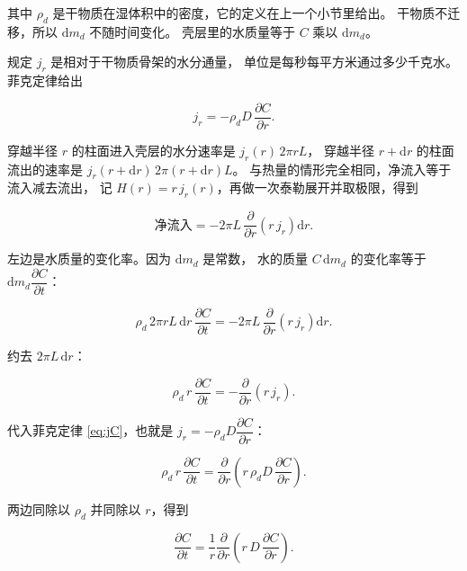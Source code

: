 其中 $\rho_d$ 是干物质在湿体积中的密度，它的定义在上一个小节里给出。
干物质不迁移，所以 $\mathrm{d}m_d$ 不随时间变化。
壳层里的水质量等于 $C$ 乘以 $\mathrm{d}m_d$。

规定 $j_r$ 是相对于干物质骨架的水分通量，
单位是每秒每平方米通过多少千克水。菲克定律给出

\begin{equation}
j_r = -\rho_d D\,\frac{\partial C}{\partial r}.
\label{eq:jC}
\end{equation}

穿越半径 $r$ 的柱面进入壳层的水分速率是 $j_r(r)\,2\pi r L$，
穿越半径 $r+\mathrm{d}r$ 的柱面流出的速率是
$j_r(r+\mathrm{d}r)\,2\pi(r+\mathrm{d}r)L$。
与热量的情形完全相同，净流入等于流入减去流出，
记 $H(r)=r\,j_r(r)$，再做一次泰勒展开并取极限，得到

\begin{equation}
\text{净流入} = -2\pi L\,\frac{\partial}{\partial r}\left(r\,j_r\right)\mathrm{d}r .
\end{equation}

左边是水质量的变化率。因为 $\mathrm{d}m_d$ 是常数，
水的质量 $C\,\mathrm{d}m_d$ 的变化率等于 $\mathrm{d}m_d\dfrac{\partial C}{\partial t}$：

\begin{equation}
\rho_d\,2\pi r L\,\mathrm{d}r\,\frac{\partial C}{\partial t}
= -2\pi L\,\frac{\partial}{\partial r}\left(r\,j_r\right)\mathrm{d}r .
\end{equation}

约去 $2\pi L\,\mathrm{d}r$：

\begin{equation}
\rho_d\,r\,\frac{\partial C}{\partial t}
= -\frac{\partial}{\partial r}\left(r\,j_r\right).
\end{equation}

代入菲克定律 \eqref{eq:jC}，也就是
$j_r=-\rho_d D\dfrac{\partial C}{\partial r}$：

\begin{equation}
\rho_d\,r\,\frac{\partial C}{\partial t}
= \frac{\partial}{\partial r}\left(r\,\rho_d D\,\frac{\partial C}{\partial r}\right).
\end{equation}

两边同除以 $\rho_d$ 并同除以 $r$，得到

\begin{equation}
\frac{\partial C}{\partial t}
= \frac{1}{r}\frac{\partial}{\partial r}\left(r\,D\,\frac{\partial C}{\partial r}\right).
\end{equation}

